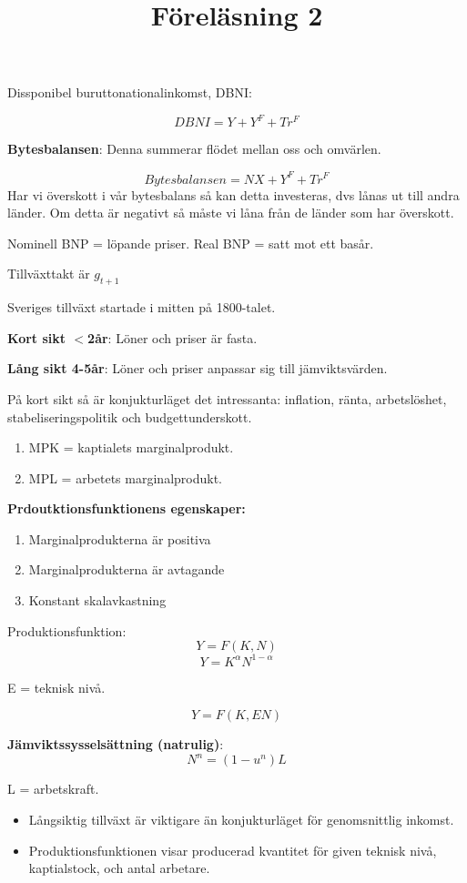 \documentclass{article}
\begin{document}
Dissponibel buruttonationalinkomst, DBNI: 

$$
DBNI = Y + Y^F + Tr^F 
$$


\textbf{Bytesbalansen}: Denna summerar flödet mellan oss och omvärlen. 

$$
Bytesbalansen = NX + Y^F + Tr^F
$$
Har vi överskott i vår bytesbalans så kan detta investeras, dvs lånas ut till andra länder. Om detta är negativt så måste vi låna från de länder som har överskott. 


Nominell BNP = löpande priser.
Real BNP = satt mot ett basår. 
\par \noindent
Tillväxttakt är $g_{t+1}$

\vspace{5mm}


\title{Föreläsning 2}
\vspace{5mm}\par

Sveriges tillväxt startade i mitten på 1800-talet. 

\textbf{Kort sikt $< $2år}: Löner och priser är fasta. 

\textbf{Lång sikt 4-5år}: Löner och priser anpassar sig till jämviktsvärden. 

På kort sikt så är konjukturläget det intressanta: inflation, ränta, arbetslöshet, stabeliseringspolitik och budgettunderskott. 

\begin{enumerate}
 \item MPK = kaptialets marginalprodukt. 
 \item MPL = arbetets marginalprodukt. 
\end{enumerate}

\textbf{Prdoutktionsfunktionens egenskaper:}
\begin{enumerate}
 \item Marginalprodukterna är positiva
 \item Marginalprodukterna är avtagande
 \item Konstant skalavkastning
\end{enumerate}

Produktionsfunktion: $$ Y = F(K,N) $$
$$ Y = K^{\alpha}N^{1-\alpha}$$

E = teknisk nivå. 

$$ Y = F(K,EN)$$

\textbf{Jämviktssysselsättning (natrulig)}:
$$N^n = (1-u^n)L $$

L = arbetskraft. 

\begin{itemize}
    \item Långsiktig tillväxt är viktigare än konjukturläget för genomsnittlig inkomst.
    \item Produktionsfunktionen visar producerad kvantitet för given teknisk nivå, kaptialstock, och antal arbetare. 
\end{itemize}
\end{document}
